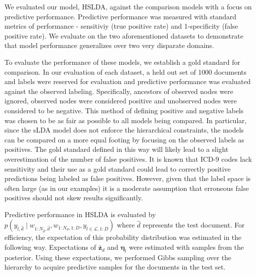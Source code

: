 We evaluated our model, HSLDA, against the comparison models with a focus
on predictive performance. Predictive performance was measured with
standard metrics of performance - sensitiviy (true positive rate) and 
1-specificity (false positive rate). We evaluate on the two aforementioned
datasets to demonstrate that model performance generalizes over two very disparate
domains.

To evaluate the performance of these models, we establish a gold standard for comparison.
In our evaluation of each dataset, a held out set of 1000 documents and labels were
reserved for evaluation and predictive performance was evaluated against the observed
labeling. Specifically, ancestors of observed nodes were ignored, observed nodes 
were considered positive and unobserved nodes were considered to be negative. This method of 
defining positive and negative labels was chosen to be as fair as possible to all models
being compared.  In particular, since the sLDA model does not enforce the hierarchical
constraints, the models can be compared on a more equal footing by focusing on the observed labels
as positives. The gold standard defined in this way will likely lead to a slight overestimation of the number of
false positives. It is known that ICD-9 codes lack sensitivity and their use as a
gold standard could lead to correctly positive predictions being labeled as false positives.
However, given that the label space is often large (as in our examples) it is a moderate assumption that
erroneous false positives should not skew results significantly.

Predictive performance in HSLDA is evaluated by $p\left(y_{l,\hat{d}}\mid w_{1:N_{\hat{d}},\hat{d}}, w_{1:N_d,1:D},  y_{l\in\mathcal{L},1:D}\right)$ where $\hat{d}$ represents the test document. For efficiency,
the expectation of this probability distribution was estimated in the following way. Expectations
of $\mathbf{\bar{z}}_d$ and $\boldsymbol{\eta}_l$ were estimated with samples from the posterior.
Using these expectations, we performed Gibbs sampling over the hierarchy to acquire predictive
samples for the documents in the test set.


